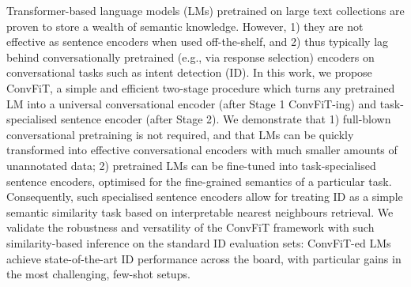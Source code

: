 Transformer-based language models (LMs) pretrained on large text collections are proven to store a wealth of semantic knowledge. However, 1) they are not effective as sentence encoders when used off-the-shelf, and 2) thus typically lag behind conversationally pretrained (e.g., via response selection) encoders on conversational tasks such as intent detection (ID). In this work, we propose ConvFiT, a simple and efficient two-stage procedure which turns any pretrained LM into a universal conversational encoder (after Stage 1 ConvFiT-ing) and task-specialised sentence encoder (after Stage 2). We demonstrate that 1) full-blown conversational pretraining is not required, and that LMs can be quickly transformed into effective conversational encoders with much smaller amounts of unannotated data; 2) pretrained LMs can be fine-tuned into task-specialised sentence encoders, optimised for the fine-grained semantics of a particular task. Consequently, such specialised sentence encoders allow for treating ID as a simple semantic similarity task based on interpretable nearest neighbours retrieval. We validate the robustness and versatility of the ConvFiT framework with such similarity-based inference on the standard ID evaluation sets: ConvFiT-ed LMs achieve state-of-the-art ID performance across the board, with particular gains in the most challenging, few-shot setups.
